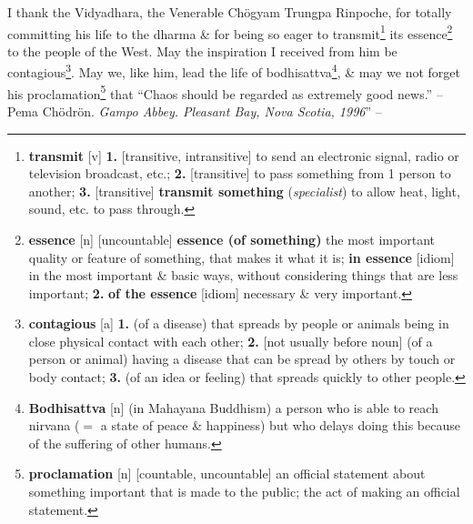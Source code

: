 \documentclass[oneside]{book}
\numberwithin{equation}{section}
\begin{document}
I thank the Vidyadhara, the Venerable Ch\"ogyam Trungpa Rinpoche, for totally committing his life to the dharma \& for being so eager to transmit\footnote{\textbf{transmit} [v] \textbf{1.} [transitive, intransitive] to send an electronic signal, radio or television broadcast, etc.; \textbf{2.} [transitive] to pass something from 1 person to another; \textbf{3.} [transitive] \textbf{transmit something} (\textit{specialist}) to allow heat, light, sound, etc. to pass through.} its essence\footnote{\textbf{essence} [n] [uncountable] \textbf{essence (of something)} the most important quality or feature of something, that makes it what it is; \textbf{in essence} [idiom] in the most important \& basic ways, without considering things that are less important; \textbf{2.} \textbf{of the essence} [idiom] necessary \& very important.} to the people of the West. May the inspiration I received from him be contagious\footnote{\textbf{contagious} [a] \textbf{1.} (of a disease) that spreads by people or animals being in close physical contact with each other; \textbf{2.} [not usually before noun] (of a person or animal) having a disease that can be spread by others by touch or body contact; \textbf{3.} (of an idea or feeling) that spreads quickly to other people.}. May we, like him, lead the life of bodhisattva\footnote{\textbf{Bodhisattva} [n] (in Mahayana Buddhism) a person who is able to reach nirvana ($=$ a state of peace \& happiness) but who delays doing this because of the suffering of other humans.}, \& may we not forget his proclamation\footnote{\textbf{proclamation} [n] [countable, uncountable] an official statement about something important that is made to the public; the act of making an official statement.} that ``Chaos should be regarded as extremely good news.'' -- Pema Ch\"odr\"on. \textit{Gampo Abbey. Pleasant Bay, Nova Scotia, 1996}'' -- \cite[pp. xi--xiv]{Chodron2002}

\end{document}

